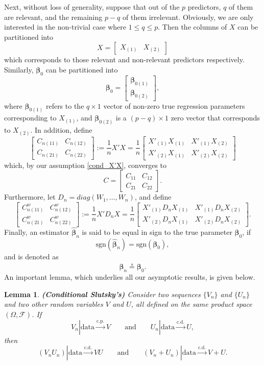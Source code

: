 \documentclass[12pt]{article}
\newcommand{\bhat}{\widehat{\bm{\beta}}_n} %
\newcommand{\be}{\bm{\beta}} %
\newcommand{\dn}{\frac{1}{n}} %
\newcommand{\CONV}[1]{\stackrel{\text{#1}}{\longrightarrow}} %
\newcommand{\cnwa}{C_{n(11)}^w}
\newcommand{\cnwb}{C_{n(12)}^w}
\newcommand{\cnwc}{C_{n(21)}^w}
\newcommand{\cnwd}{C_{n(22)}^w}
\newtheorem{lem}{Lemma}[section]
\begin{document}
Next, without loss of generality, suppose that out of the $p$ predictors, $q$ of them are relevant, and the remaining $p-q$ of them irrelevant. Obviously, we are only interested in the non-trivial case where $1 \leq q \leq p$. Then the columns of $X$ can be partitioned into 
	\[
		X = 
		\begin{bmatrix}
			X_{(1)} & X_{(2)}
		\end{bmatrix}
	\]
which corresponds to those relevant and non-relevant predictors respectively. Similarly, $\be_0$ can be partitioned into 
	\[
		\be_0 = 
		\begin{bmatrix}
			\be_{0(1)} \\
			\be_{0(2)}
		\end{bmatrix}
		,
	\]
where $\be_{0(1)}$ refers to the $q \times 1$ vector of non-zero true regression parameters corresponding to $X_{(1)}$, and $\be_{0(2)}$ is a $(p-q) \times 1$ zero vector that corresponds to $X_{(2)}$. In addition, define 
	\[
		\begin{bmatrix}
			C_{n(11)} & C_{n(12)} \\
			C_{n(21)} & C_{n(22)} 
		\end{bmatrix}
		:= \dn X'X = \dn
		\begin{bmatrix}
			X'_{(1)} X_{(1)} & X'_{(1)} X_{(2)} \\
			X'_{(2)} X_{(1)} & X'_{(2)} X_{(2)}
		\end{bmatrix}
	\]
which, by our assumption \eqref{cond_X'X}, converges to 
	\[
		C = 
		\begin{bmatrix}
			C_{11} & C_{12}\\
			C_{21} & C_{22}
		\end{bmatrix}
		.
	\]	
Furthermore, let $D_n = diag(W_1, \ldots, W_n)$, and define 
	\[
		\begin{bmatrix}
			\cnwa & \cnwb \\
			\cnwc & \cnwd 
		\end{bmatrix}
		:= \dn X' D_n X = \dn
		\begin{bmatrix}
			X'_{(1)} D_n X_{(1)} & X'_{(1)} D_n X_{(2)} \\
			X'_{(2)} D_n X_{(1)} & X'_{(2)} D_n X_{(2)}
		\end{bmatrix}
		.
	\]
Finally, an estimator $\bhat$ is said to be equal in sign to the true parameter $\be_0$, if 
	$$
	\text{sgn}(\bhat) = \text{sgn}(\be_0),
	$$
and is denoted as
	$$
	\bhat \stackrel{s}{=} \be_0.
	$$	
An important lemma, which underlies all our asymptotic results, is given below.

\begin{lem} \label{lem_slutsky}
	\textbf{(Conditional Slutsky's)} Consider two sequences $\{V_n\}$ and $\{U_n\}$ and two other random variables $V$ and $U$, all defined on the same product space $(\Omega, \mathcal{F})$. If
	$$
	V_n | \text{data} \CONV{c.p.} V 
	\qquad \text{and} \qquad
	U_n | \text{data} \CONV{c.d.} U,
	$$
	then
	$$
	(V_n U_n) | \text{data} \CONV{c.d.} V U 
	\qquad \text{and} \qquad 
	(V_n + U_n) | \text{data} \CONV{c.d.} V + U.
	$$
\end{lem} 
\end{document}
